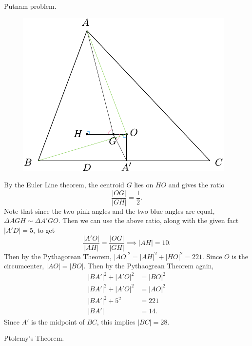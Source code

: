 \documentclass[twoside,10pt]{article}
\begin{document}

\begin{exer}[1.138]
Putnam problem.
\end{exer}

\begin{figure}[H]
        \centering
        \includegraphics[scale=1]{fig/138.pdf}
\end{figure}

By the Euler Line theorem, the centroid $G$ lies on $HO$ and gives the ratio
\[
\frac{|OG|}{|GH|} = \frac{1}{2} .
\] Note that since the two pink angles and the two blue angles are equal, $\Delta AGH \sim \Delta A'GO$. Then we can use the above ratio, along with the given fact $|A'D|=5$, to get
\[
\frac{|A'O|}{|AH|} = \frac{|OG|}{|GH|} \implies |AH| = 10.
\] Then by the Pythagorean Theorem, $|AO|^2 = |AH|^2 + |HO|^2 = 221$. Since $O$ is the circumcenter, $|AO|=|BO|$. Then by the Pythaogrean Theorem again,
\begin{align*}
        |BA'|^2 + |A'O|^2 &= |BO|^2 \\
        |BA'|^2 + |A'O|^2 &= |AO|^2 \\
        |BA'|^2 + 5^2 &= 221 \\
        |BA'| &= 14.
\end{align*}
Since $A'$ is the midpoint of $ BC$, this implies $|BC|=28$.

\newpage

\begin{exer}[1.151]
Ptolemy's Theorem.
\end{exer}
\end{document}
